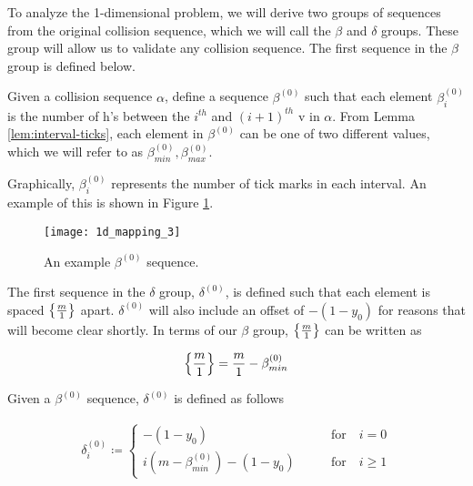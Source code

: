 
To analyze the 1-dimensional problem, we will derive two groups of sequences from the original collision sequence, which we will call the $\beta$ and $\delta$ groups. These group will allow us to validate any collision sequence. The first sequence in the $\beta$ group is defined below.

\begin{definition}
	Given a collision sequence $\alpha$, define a sequence $\beta^{(0)}$ such that each element $\beta^{(0)}_i$ is the number of h's between the $i^{th}$ and $(i+1)^{th}$ v in $\alpha$. From Lemma \ref{lem:interval-ticks}, each element in $\beta^{(0)}$ can be one of two different values, which we will refer to as $\beta^{(0)}_{min}, \beta^{(0)}_{max}$.
\end{definition}

Graphically, $\beta^{(0)}_i$ represents the number of tick marks in each interval. An example of this is shown in Figure \ref{fig:beta-sequence}.

\begin{figure}[H]
  \begin{center}
    \texttt{[image: 1d\_mapping\_3]}
  \end{center}
  \vspace{-.2in} %
  \caption{\label{fig:beta-sequence} An example $\beta^{(0)}$ sequence.}
\end{figure}

The first sequence in the $\delta$ group, $\delta^{(0)}$, is defined such that each element is spaced $\cbracket{\frac{m}{1}}$ apart. $\delta^{(0)}$ will also include an offset of $-(1-y_0)$ for reasons that will become clear shortly. In terms of our $\beta$ group, $\cbracket{\frac{m}{1}}$ can be written as 

\begin{equation}
  \cbracket{\frac{m}{1}} = \frac{m}{1} - \beta^{(0)}_{min}
\end{equation}

\begin{definition}
  Given a $\beta^{(0)}$ sequence, $\delta^{(0)}$ is defined as follows

  \begin{align}\label{delta_beta}
    \delta^{(0)}_i \coloneqq \begin{cases}
      -(1-y_0) \qquad &\text{for} \quad i = 0\\
      i (m - \beta^{(0)}_{min}) - (1-y_0) \qquad &\text{for} \quad i \ge 1
    \end{cases}
  \end{align}
\end{definition}

